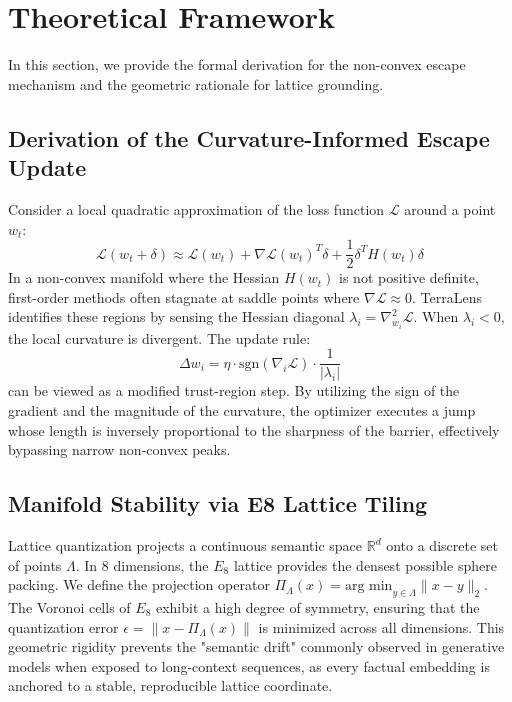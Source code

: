 \documentclass[10pt,twocolumn,letterpaper]{article}
\begin{document}
\section{Theoretical Framework}
In this section, we provide the formal derivation for the non-convex escape mechanism and the geometric rationale for lattice grounding.

\subsection{Derivation of the Curvature-Informed Escape Update}
Consider a local quadratic approximation of the loss function $\mathcal{L}$ around a point $w_t$:
\begin{equation}
\mathcal{L}(w_t + \delta) \approx \mathcal{L}(w_t) + \nabla \mathcal{L}(w_t)^T \delta + \frac{1}{2} \delta^T H(w_t) \delta
\end{equation}
In a non-convex manifold where the Hessian $H(w_t)$ is not positive definite, first-order methods often stagnate at saddle points where $\nabla \mathcal{L} \approx 0$. TerraLens identifies these regions by sensing the Hessian diagonal $\lambda_i = \nabla^2_{w_i} \mathcal{L}$. When $\lambda_i < 0$, the local curvature is divergent. The update rule:
\begin{equation}
\Delta w_i = \eta \cdot \text{sgn}(\nabla_i \mathcal{L}) \cdot \frac{1}{|\lambda_i|}
\end{equation}
can be viewed as a modified trust-region step. By utilizing the sign of the gradient and the magnitude of the curvature, the optimizer executes a jump whose length is inversely proportional to the sharpness of the barrier, effectively bypassing narrow non-convex peaks.

\subsection{Manifold Stability via E8 Lattice Tiling}
Lattice quantization projects a continuous semantic space $\mathbb{R}^d$ onto a discrete set of points $\Lambda$. In 8 dimensions, the $E_8$ lattice provides the densest possible sphere packing. We define the projection operator $\Pi_\Lambda(x) = \text{arg min}_{y \in \Lambda} \|x - y\|_2$. The Voronoi cells of $E_8$ exhibit a high degree of symmetry, ensuring that the quantization error $\epsilon = \|x - \Pi_\Lambda(x)\|$ is minimized across all dimensions. This geometric rigidity prevents the "semantic drift" commonly observed in generative models when exposed to long-context sequences, as every factual embedding is anchored to a stable, reproducible lattice coordinate.
\end{document}
